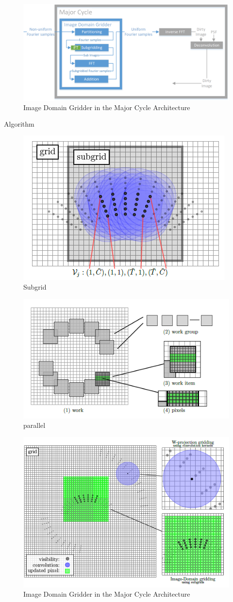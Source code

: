 \begin{figure}[h]
	\centering
	\includegraphics[width=0.80\linewidth]{./chapters/03.distribution/idg/major-minor-idg.png}
	\caption{Image Domain Gridder in the Major Cycle Architecture}
	\label{distribution:idg:system}
\end{figure}

Algorithm
\begin{figure}[h]
	\centering
	\includegraphics[width=0.40\linewidth]{./chapters/03.distribution/idg/subgrid.png}
	\caption{Subgrid}
	\label{distribution:idg:subgrid}
\end{figure}

\begin{figure}[h]
	\centering
	\includegraphics[width=0.40\linewidth]{./chapters/03.distribution/idg/paralellization.png}
	\caption{parallel}
	\label{distribution:idg:parallel}
\end{figure}

\begin{figure}[h]
	\centering
	\includegraphics[width=0.40\linewidth]{./chapters/03.distribution/idg/idg0.png}
	\caption{Image Domain Gridder in the Major Cycle Architecture}
	\label{distribution:idg:idg0}
\end{figure}


